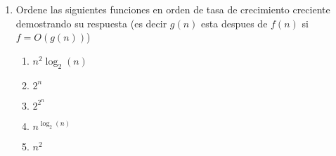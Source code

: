 \documentclass[12pt, a4paper]{article}
\begin{document}
\begin{enumerate}
\item Ordene las siguientes funciones en orden de tasa de crecimiento creciente demostrando su respuesta (es decir $g(n)$ esta despues de $f(n)$ si $f=O(g(n))$) 
\begin{enumerate}
\item $n^2\log_2(n)$
\item $2^n$
\item $2^{2^n}$
\item $n^{\log_2(n)}$
\item $n^2$
\end{enumerate}


\end{enumerate}
\end{document}
